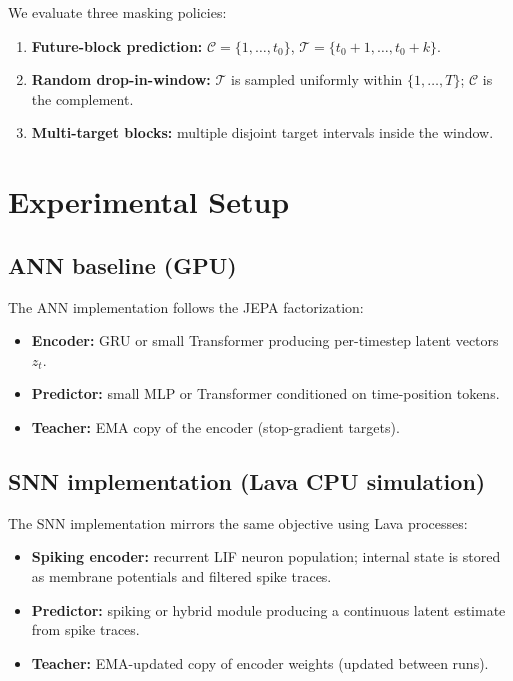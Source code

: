 \documentclass[11pt,a4paper]{article}
\begin{document}
We evaluate three masking policies:

\begin{enumerate}[label=(\roman*)]
\item \textbf{Future-block prediction:}
  $\mathcal{C}=\{1,\dots,t_0\}$, \;
  $\mathcal{T}=\{t_0{+}1,\dots,t_0{+}k\}$.
\item \textbf{Random drop-in-window:}
  $\mathcal{T}$ is sampled uniformly within $\{1,\dots,T\}$;
  $\mathcal{C}$ is the complement.
\item \textbf{Multi-target blocks:}
  multiple disjoint target intervals inside the window.
\end{enumerate}

\section{Experimental Setup}

\subsection{ANN baseline (GPU)}

The ANN implementation follows the JEPA factorization:

\begin{itemize}[nosep]
\item \textbf{Encoder:} GRU or small Transformer producing per-timestep
  latent vectors~$z_t$.
\item \textbf{Predictor:} small MLP or Transformer conditioned on
  time-position tokens.
\item \textbf{Teacher:} EMA copy of the encoder (stop-gradient targets).
\end{itemize}

\subsection{SNN implementation (Lava CPU simulation)}

The SNN implementation mirrors the same objective using Lava processes:

\begin{itemize}[nosep]
\item \textbf{Spiking encoder:} recurrent LIF neuron population; internal
  state is stored as membrane potentials and filtered spike traces.
\item \textbf{Predictor:} spiking or hybrid module producing a continuous
  latent estimate from spike traces.
\item \textbf{Teacher:} EMA-updated copy of encoder weights (updated between
  runs).
\end{itemize}
\end{document}
